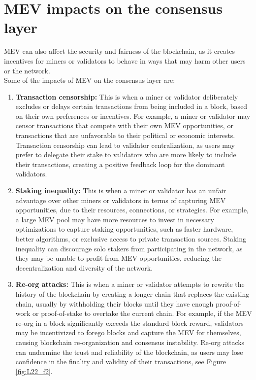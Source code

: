 \section{MEV impacts on the consensus layer}
MEV can also affect the security and fairness of the blockchain, as it creates incentives for miners or validators to behave in ways that may harm other users or the network.\\
Some of the impacts of MEV on the consensus layer are:
\begin{enumerate}
	\item \textbf{Transaction censorship:} This is when a miner or validator deliberately excludes or delays certain transactions from being included in a block, based on their own preferences or incentives. For example, a miner or validator may censor transactions that compete with their own MEV opportunities, or transactions that are unfavorable to their political or economic interests. Transaction censorship can lead to validator centralization, as users may prefer to delegate their stake to validators who are more likely to include their transactions, creating a positive feedback loop for the dominant validators.
	\item \textbf{Staking inequality:} This is when a miner or validator has an unfair advantage over other miners or validators in terms of capturing MEV opportunities, due to their resources, connections, or strategies. For example, a large MEV pool may have more resources to invest in necessary optimizations to capture staking opportunities, such as faster hardware, better algorithms, or exclusive access to private transaction sources. Staking inequality can discourage solo stakers from participating in the network, as they may be unable to profit from MEV opportunities, reducing the decentralization and diversity of the network.
	\item \textbf{Re-org attacks:} This is when a miner or validator attempts to rewrite the history of the blockchain by creating a longer chain that replaces the existing chain, usually by withholding their blocks until they have enough proof-of-work or proof-of-stake to overtake the current chain. For example, if the MEV re-org in a block significantly exceeds the standard block reward, validators may be incentivized to forego blocks and capture the MEV for themselves, causing blockchain re-organization and consensus instability. Re-org attacks can undermine the trust and reliability of the blockchain, as users may lose confidence in the finality and validity of their transactions, see Figure \ref{fig:L22_f2}.
\end{enumerate}
